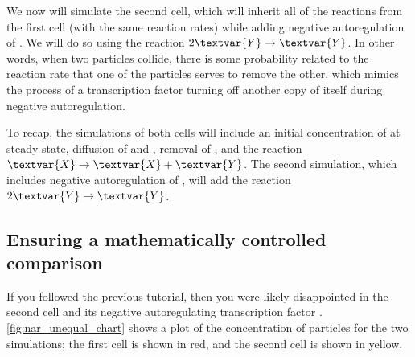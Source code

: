 We now will simulate the second cell, which will inherit all of the reactions from the first cell (with the same reaction rates) while adding negative autoregulation of . We will do so using the reaction $2\textvar{Y} \rightarrow \textvar{Y}$. In other words, when two  particles collide, there is some probability related to the reaction rate that one of the particles serves to remove the other, which mimics the process of a transcription factor turning off another copy of itself during negative autoregulation.

To recap, the simulations of both cells will include an initial concentration of  at steady state, diffusion of  and , removal of , and the reaction $\textvar{X} \rightarrow \textvar{X} + \textvar{Y}$. The second simulation, which includes negative autoregulation of , will add the reaction $2\textvar{Y} \rightarrow \textvar{Y}$. \\

\begin{note}\end{note}

\FloatBarrier
{}
\subsection{Ensuring a mathematically controlled comparison}

If you followed the previous tutorial, then you were likely disappointed in the second cell and its negative autoregulating transcription factor . \autoref{fig:nar_unequal_chart} shows a plot of the concentration of  particles for the two simulations; the first cell is shown in red, and the second cell is shown in yellow.\\

